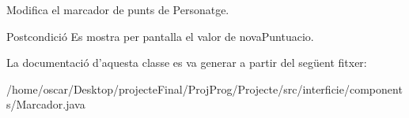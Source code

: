 Modifica el marcador de punts de Personatge. 

\begin{DoxyPostcond}{Postcondició}
Es mostra per pantalla el valor de nova\+Puntuacio. 
\end{DoxyPostcond}


La documentació d'aquesta classe es va generar a partir del següent fitxer\+:\begin{DoxyCompactItemize}
\item 
/home/oscar/\+Desktop/projecte\+Final/\+Proj\+Prog/\+Projecte/src/interficie/components/Marcador.\+java\end{DoxyCompactItemize}

